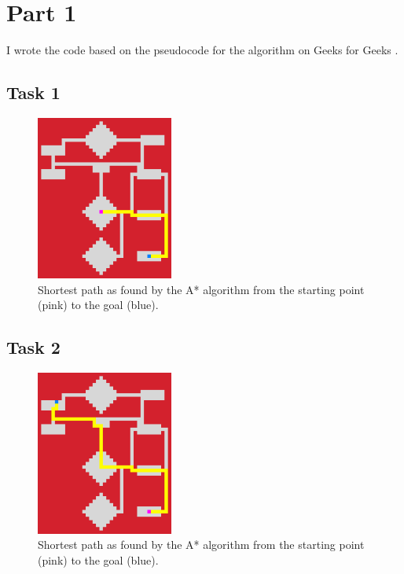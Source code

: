 \section*{Part 1}

I wrote the code based on the pseudocode for the algorithm on Geeks for Geeks \cite{astar_gfg}. 

\subsection*{Task 1}

\begin{figure}[h!]
    \centering
    \includegraphics[width=0.4\textwidth]{"../Images/task_1.png"}
    \caption{Shortest path as found by the A* algorithm from the starting point (pink) to the goal (blue).}
\end{figure}

\subsection*{Task 2}
\begin{figure}[h!]
    \centering
    \includegraphics[width=0.4\textwidth]{"../Images/task_2.png"}
    \caption{Shortest path as found by the A* algorithm from the starting point (pink) to the goal (blue).}
\end{figure}

